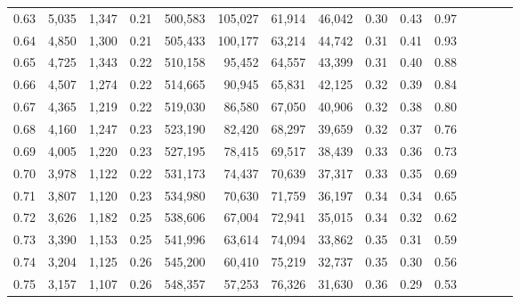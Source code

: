 \begin{tabular}{rrrcrrrrrrrrrrr}
0.63 &   5,035 &   1,347 &                                       0.21 &  500,583 &  105,027 &   61,914 &   46,042 &  0.30 &  0.43 &                         0.97 \\
0.64 &   4,850 &   1,300 &                                       0.21 &  505,433 &  100,177 &   63,214 &   44,742 &  0.31 &  0.41 &                         0.93 \\
0.65 &   4,725 &   1,343 &                                       0.22 &  510,158 &   95,452 &   64,557 &   43,399 &  0.31 &  0.40 &                         0.88 \\
0.66 &   4,507 &   1,274 &                                       0.22 &  514,665 &   90,945 &   65,831 &   42,125 &  0.32 &  0.39 &                         0.84 \\
0.67 &   4,365 &   1,219 &                                       0.22 &  519,030 &   86,580 &   67,050 &   40,906 &  0.32 &  0.38 &                         0.80 \\
0.68 &   4,160 &   1,247 &                                       0.23 &  523,190 &   82,420 &   68,297 &   39,659 &  0.32 &  0.37 &                         0.76 \\
0.69 &   4,005 &   1,220 &                                       0.23 &  527,195 &   78,415 &   69,517 &   38,439 &  0.33 &  0.36 &                         0.73 \\
0.70 &   3,978 &   1,122 &                                       0.22 &  531,173 &   74,437 &   70,639 &   37,317 &  0.33 &  0.35 &                         0.69 \\
0.71 &   3,807 &   1,120 &                                       0.23 &  534,980 &   70,630 &   71,759 &   36,197 &  0.34 &  0.34 &                         0.65 \\
0.72 &   3,626 &   1,182 &                                       0.25 &  538,606 &   67,004 &   72,941 &   35,015 &  0.34 &  0.32 &                         0.62 \\
0.73 &   3,390 &   1,153 &                                       0.25 &  541,996 &   63,614 &   74,094 &   33,862 &  0.35 &  0.31 &                         0.59 \\
0.74 &   3,204 &   1,125 &                                       0.26 &  545,200 &   60,410 &   75,219 &   32,737 &  0.35 &  0.30 &                         0.56 \\
0.75 &   3,157 &   1,107 &                                       0.26 &  548,357 &   57,253 &   76,326 &   31,630 &  0.36 &  0.29 &                         0.53 \\

\end{tabular}
